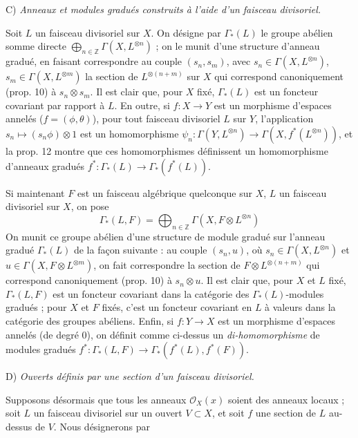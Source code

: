 C) \emph{Anneaux et modules gradués construits à l'aide d'un faisceau divisoriel.}

Soit $L$ un faisceau divisoriel sur $X$. On désigne par $\Gamma_*(L)$ le groupe abélien somme directe $\bigoplus_{n \in \mathbb{Z}} \Gamma(X, L^{\otimes n})$ ; on le munit d'une structure d'anneau gradué, en faisant correspondre au couple $(s_n, s_m)$, avec $s_n \in \Gamma(X, L^{\otimes n})$, $s_m \in \Gamma(X, L^{\otimes m})$ la section de $L^{\otimes (n+m)}$ sur $X$ qui correspond canoniquement (prop. 10) à $s_n \otimes s_m$. Il est clair que, pour $X$ fixé, $\Gamma_*(L)$ est un foncteur covariant par rapport à $L$. En outre, si $f: X \to Y$ est un morphisme d'espaces annelés ($f = (\phi, \theta)$), pour tout faisceau divisoriel $L$ sur $Y$, l'application $s_n \mapsto (s_n \phi) \otimes 1$ est un homomorphisme $\psi_n : \Gamma(Y, L^{\otimes n}) \to \Gamma(X, f^*(L^{\otimes n}))$, et la prop. 12 montre que ces homomorphismes définissent un homomorphisme d'anneaux gradués $f^* : \Gamma_*(L) \to \Gamma_*(f^*(L))$.

Si maintenant $F$ est un faisceau algébrique quelconque sur $X$, $L$ un faisceau divisoriel sur $X$, on pose
$$\Gamma_*(L, F) = \bigoplus_{n \in \mathbb{Z}} \Gamma(X, F \otimes L^{\otimes n})$$
On munit ce groupe abélien d'une structure de module gradué sur l'anneau gradué $\Gamma_*(L)$ de la façon suivante : au couple $(s_n, u)$, où $s_n \in \Gamma(X, L^{\otimes n})$ et $u \in \Gamma(X, F \otimes L^{\otimes m})$, on fait correspondre la section de $F \otimes L^{\otimes (n+m)}$ qui correspond canoniquement (prop. 10) à $s_n \otimes u$. Il est clair que, pour $X$ et $L$ fixé, $\Gamma_*(L, F)$ est un foncteur covariant dans la catégorie des $\Gamma_*(L)$-modules gradués ; pour $X$ et $F$ fixés, c'est un foncteur covariant en $L$ à valeurs dans la catégorie des groupes abéliens. Enfin, si $f: Y \to X$ est un morphisme d'espaces annelés (de degré 0), on définit comme ci-dessus un \emph{di-homomorphisme} de modules gradués $f^* : \Gamma_*(L, F) \to \Gamma_*(f^*(L), f^*(F))$.

D) \emph{Ouverts définis par une section d'un faisceau divisoriel.}

Supposons désormais que tous les anneaux $\mathcal{O}_X(x)$ soient des anneaux locaux ; soit $L$ un faisceau divisoriel sur un ouvert $V \subset X$, et soit $f$ une section de $L$ au-dessus de $V$. Nous désignerons par

\newpage


